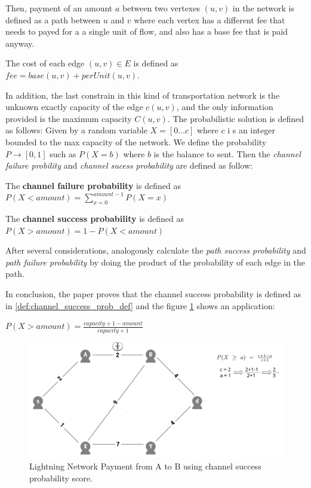 Then, payment of an amount $a$ between two vertexes $(u, v)$ in the network is defined 
as a path between $u$ and $v$ where each vertex has a different fee that needs to payed for a 
a single unit of flow, and also has a base fee that is paid anyway.

\begin{definition}
    The cost of each edge $(u, v) \in E$ is defined as $fee = base(u, v) + perUnit(u, v)$.
\end{definition}

In addition, the last constrain in this kind of transportation network is the 
unknown exactly capacity of the edge $c(u, v)$, and the only information provided 
is the maximum capacity $C(u, v)$.
The probabilistic solution is defined as follows: Given by a random variable $X = [0 \dots c]$ where $c$ i
s an integer bounded to the max capacity of the network. We define the probability 
$P \rightarrow [0, 1]$ such as $P(X = b)$ where $b$ is the balance to sent.
Then the \emph{channel failure probility} and \emph{channel sucess probability} are defined as follow:

\begin{definition}
   The {\bf channel failure probability} is defined as $P(X < amount) = \sum_{x = 0}^{amount - 1} P(X = x)$ 
\end{definition}

\begin{definition}
    The {\bf channel success probability} is defined as $P(X > amount) = 1 -  P(X < amount)$
\end{definition}

After several considerations, analogously calculate the \emph{path success probability} and
\emph{path failure probability} by doing the product of the probability of each edge in the path.

In conclusion, the paper proves that the channel success probability is defined as in 
\ref{def:channel_success_prob_def} and the figure \ref{fig:channel_success_prob_score}
shows an application: 

\begin{definition}
\label{def:channel_success_prob_def}
    $P(X > amount) = \frac{capacity + 1 - amount}{capacity + 1}$
\end{definition}


\begin{figure}[h]
  \begin{center}
  \includegraphics[width=0.6\columnwidth]{imgs/mincost_rene1.png}
  \end{center}
  \caption{Lightning Network Payment from A to B using channel success probability score.} 
  \label{fig:channel_success_prob_score}
\end{figure}


